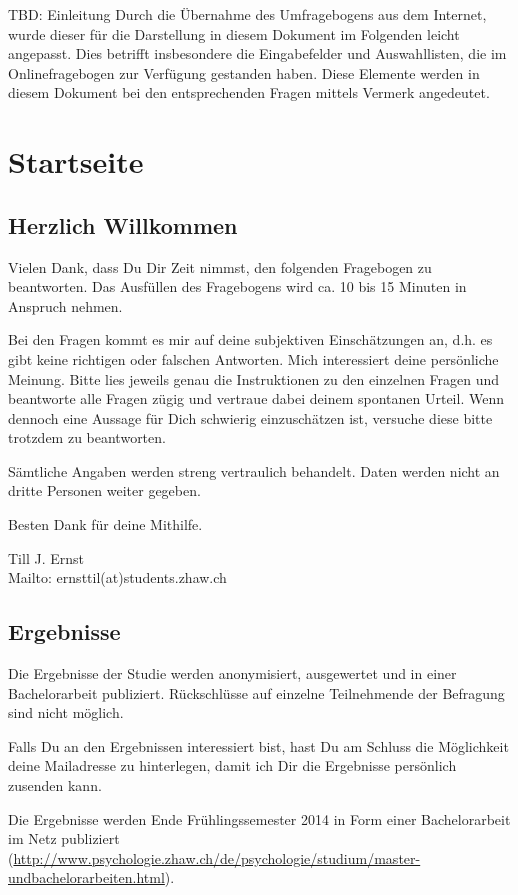 \begin{RaggedRight}
TBD: Einleitung
Durch die Übernahme des Umfragebogens aus dem Internet, wurde dieser für die Darstellung in diesem Dokument im Folgenden leicht angepasst. Dies betrifft insbesondere die Eingabefelder und Auswahllisten, die im Onlinefragebogen zur Verfügung gestanden haben. Diese Elemente werden in diesem Dokument bei den entsprechenden Fragen mittels Vermerk angedeutet.
\section{Startseite}\label{anhangSesction.Startseite}
\subsection*{Herzlich Willkommen}
Vielen Dank, dass Du Dir Zeit nimmst, den folgenden Fragebogen zu beantworten. Das Ausfüllen des Fragebogens wird ca. 10 bis 15 Minuten in Anspruch nehmen.\par
Bei den Fragen kommt es mir auf deine subjektiven Einschätzungen an, d.h. es gibt keine richtigen oder falschen Antworten. Mich interessiert deine persönliche Meinung. Bitte lies jeweils genau die Instruktionen zu den einzelnen Fragen und beantworte alle Fragen zügig und vertraue dabei deinem spontanen Urteil. Wenn dennoch eine Aussage für Dich schwierig einzuschätzen ist, versuche diese bitte trotzdem zu beantworten. \par
Sämtliche Angaben werden streng vertraulich behandelt. Daten werden nicht an dritte Personen weiter gegeben. \par
Besten Dank für deine Mithilfe.\par
Till J. Ernst\\
Mailto: ernsttil(at)students.zhaw.ch
\subsection*{Ergebnisse}
Die Ergebnisse der Studie werden anonymisiert, ausgewertet und in einer Bachelorarbeit publiziert. Rückschlüsse auf einzelne Teilnehmende der Befragung sind nicht möglich.\par
Falls Du an den Ergebnissen interessiert bist, hast Du am Schluss die Möglichkeit deine Mailadresse zu hinterlegen, damit ich Dir die Ergebnisse persönlich zusenden kann. \par
Die Ergebnisse werden Ende Frühlingssemester 2014 in Form einer Bachelorarbeit im Netz publiziert (\url{http://www.psychologie.zhaw.ch/de/psychologie/studium/master-undbachelorarbeiten.html}).

\end{RaggedRight}
